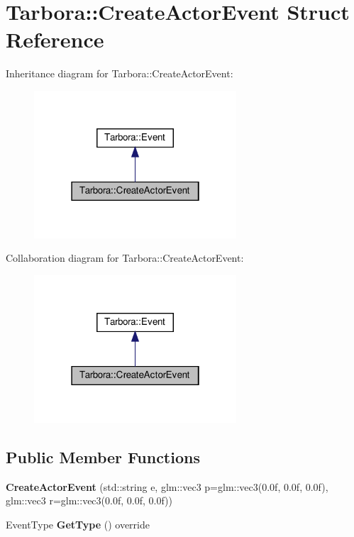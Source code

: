 \hypertarget{structTarbora_1_1CreateActorEvent}{}\section{Tarbora\+:\+:Create\+Actor\+Event Struct Reference}
\label{structTarbora_1_1CreateActorEvent}


Inheritance diagram for Tarbora\+:\+:Create\+Actor\+Event\+:\nopagebreak
\begin{figure}[H]
\begin{center}
\leavevmode
\includegraphics[width=214pt]{structTarbora_1_1CreateActorEvent__inherit__graph}
\end{center}
\end{figure}


Collaboration diagram for Tarbora\+:\+:Create\+Actor\+Event\+:\nopagebreak
\begin{figure}[H]
\begin{center}
\leavevmode
\includegraphics[width=214pt]{structTarbora_1_1CreateActorEvent__coll__graph}
\end{center}
\end{figure}
\subsection*{Public Member Functions}
\begin{DoxyCompactItemize}
\item 
\mbox{\label{structTarbora_1_1CreateActorEvent_a887f217fe796972f74e05545969ab333}} 
{\bfseries Create\+Actor\+Event} (std\+::string e, glm\+::vec3 p=glm\+::vec3(0.\+0f, 0.\+0f, 0.\+0f), glm\+::vec3 r=glm\+::vec3(0.\+0f, 0.\+0f, 0.\+0f))
\item 
\mbox{\label{structTarbora_1_1CreateActorEvent_a54efb56f73eac01432cb6d0009814cd4}} 
Event\+Type {\bfseries Get\+Type} () override
\end{DoxyCompactItemize}
